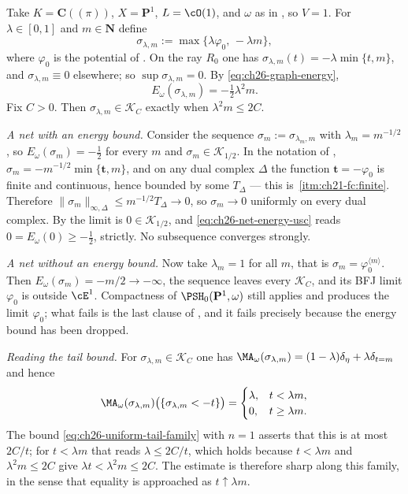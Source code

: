 \begin{example}
\label{ex:ch26-compactness-worked}
Take \(K=\mathbf C((\pi))\), \(X=\mathbf P^1\), \(L=\cO(1)\), and \(\omega\)
as in , so \(V=1\).  For
\(\lambda\in[0,1]\) and \(m\in\mathbf N\) define
\[
 \sigma_{\lambda,m}:=\max\{\lambda\varphi_0,\,-\lambda m\},
\]
where \(\varphi_0\) is the potential of .  On
the ray \(R_0\) one has \(\sigma_{\lambda,m}(t)=-\lambda\min\{t,m\}\), and
\(\sigma_{\lambda,m}\equiv0\) elsewhere; so
\(\sup\sigma_{\lambda,m}=0\).  By \eqref{eq:ch26-graph-energy},
\[
 E_\omega(\sigma_{\lambda,m})=-\tfrac12\lambda^2m .
\]
Fix \(C>0\).  Then \(\sigma_{\lambda,m}\in\mathcal K_C\) exactly when
\(\lambda^2m\leq2C\).

\emph{A net with an energy bound.}  Consider the sequence
\(\sigma_m:=\sigma_{\lambda_m,m}\) with
\(\lambda_m=m^{-1/2}\), so \(E_\omega(\sigma_m)=-\tfrac12\) for every
\(m\) and \(\sigma_m\in\mathcal K_{1/2}\).  In the notation of
,
\(\sigma_m=-m^{-1/2}\min\{\mathbf t,m\}\), and on any dual complex
\(\Delta\) the function \(\mathbf t=-\varphi_0\) is finite and continuous,
hence bounded by some \(T_\Delta\) --- this is
\,\cref{itm:ch21-fc:finite}.  Therefore
\(\lVert\sigma_m\rVert_{\infty,\Delta}\leq m^{-1/2}T_\Delta\to0\), so
\(\sigma_m\to0\) uniformly on every dual complex.  By
 the limit is \(0\in\mathcal K_{1/2}\), and
\eqref{eq:ch26-net-energy-usc} reads
\(0=E_\omega(0)\geq-\tfrac12\), strictly.  No subsequence converges strongly.

\emph{A net without an energy bound.}  Now take
\(\lambda_m=1\) for all \(m\), that is \(\sigma_m=\varphi_0^{\langle
m\rangle}\).  Then \(E_\omega(\sigma_m)=-m/2\to-\infty\), the sequence leaves
every \(\mathcal K_C\), and its BFJ limit \(\varphi_0\) is outside
\(\cE^1\).  Compactness of \(\PSH_0(\mathbf P^1,\omega)\) still applies and
produces the limit \(\varphi_0\); what fails is the last clause of
, and it fails precisely because the energy
bound has been dropped.

\emph{Reading the tail bound.}  For \(\sigma_{\lambda,m}\in\mathcal K_C\) one
has \(\MA_\omega(\sigma_{\lambda,m})
=(1-\lambda)\delta_\eta+\lambda\delta_{t=m}\) and hence
\[
 \MA_\omega(\sigma_{\lambda,m})
   \bigl(\{\sigma_{\lambda,m}<-t\}\bigr)
 =\begin{cases}\lambda,&t<\lambda m,\\ 0,&t\geq\lambda m.\end{cases}
\]
The bound \eqref{eq:ch26-uniform-tail-family} with \(n=1\) asserts that this
is at most \(2C/t\); for \(t<\lambda m\) that reads
\(\lambda\leq2C/t\), which holds because
\(t<\lambda m\) and \(\lambda^2m\leq2C\) give
\(\lambda t<\lambda^2m\leq2C\).  The estimate is therefore sharp along this
family, in the sense that equality is approached as \(t\uparrow\lambda m\).
\end{example}

